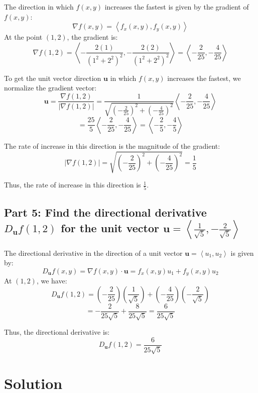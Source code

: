 \documentclass[11pt]{article}
\begin{document}
The direction in which \( f(x, y) \) increases the fastest is given by the gradient of \( f(x, y) \):
\[
\nabla f(x, y) = \left\langle f_x(x, y), f_y(x, y) \right\rangle
\]
At the point \( (1, 2) \), the gradient is:
\[
\nabla f(1, 2) = \left\langle -\frac{2(1)}{(1^2 + 2^2)^2}, -\frac{2(2)}{(1^2 + 2^2)^2} \right\rangle = \left\langle -\frac{2}{25}, -\frac{4}{25} \right\rangle
\]

To get the unit vector direction \( \mathbf{u} \) in which \( f(x, y) \) increases the fastest, we normalize the gradient vector:
\[
\mathbf{u} = \frac{\nabla f(1, 2)}{|\nabla f(1, 2)|} = \frac{1}{\sqrt{\left( -\frac{2}{25} \right)^2 + \left( -\frac{4}{25} \right)^2}} \left\langle -\frac{2}{25}, -\frac{4}{25} \right\rangle
\]
\[
= \frac{25}{5} \left\langle -\frac{2}{25}, -\frac{4}{25} \right\rangle = \left\langle -\frac{2}{5}, -\frac{4}{5} \right\rangle
\]

The rate of increase in this direction is the magnitude of the gradient:
\[
|\nabla f(1, 2)| = \sqrt{\left( -\frac{2}{25} \right)^2 + \left( -\frac{4}{25} \right)^2} = \frac{1}{5}
\]

Thus, the rate of increase in this direction is \( \frac{1}{5} \).

\newpage

\subsection{Part 5: Find the directional derivative \( D_{\mathbf{u}}f(1, 2) \) for the unit vector \( \mathbf{u} = \left\langle \frac{1}{\sqrt{5}}, -\frac{2}{\sqrt{5}} \right\rangle \)}

The directional derivative in the direction of a unit vector \( \mathbf{u} = \left\langle u_1, u_2 \right\rangle \) is given by:
\[
D_{\mathbf{u}}f(x, y) = \nabla f(x, y) \cdot \mathbf{u} = f_x(x, y) u_1 + f_y(x, y) u_2
\]
At \( (1, 2) \), we have:
\[
D_{\mathbf{u}}f(1, 2) = \left( -\frac{2}{25} \right) \left( \frac{1}{\sqrt{5}} \right) + \left( -\frac{4}{25} \right) \left( -\frac{2}{\sqrt{5}} \right)
\]
\[
= -\frac{2}{25\sqrt{5}} + \frac{8}{25\sqrt{5}} = \frac{6}{25\sqrt{5}}
\]

Thus, the directional derivative is:
\[
D_{\mathbf{u}}f(1, 2) = \frac{6}{25\sqrt{5}}
\]




\newpage

\section{Solution}
\end{document}

